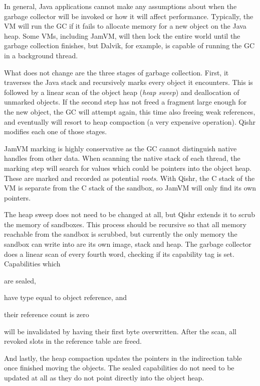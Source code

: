 \documentclass[a4paper,12pt,twoside,openright]{report}
\begin{document}
In general, Java applications cannot make any assumptions about when the garbage collector will be invoked or how it will affect performance. Typically, the VM will run the GC if it fails to allocate memory for a new object on the Java heap. Some VMs, including JamVM, will then lock the entire world until the garbage collection finishes, but Dalvik, for example, is capable of running the GC in a background thread. 

What does not change are the three stages of garbage collection. First, it traverses the Java stack and recursively marks every object it encounters. This is followed by a linear scan of the object heap (\emph{heap sweep}) and deallocation of unmarked objects. If the second step has not freed a fragment large enough for the new object, the GC will attempt again, this time also freeing weak references, and eventually will resort to heap compaction (a very expensive operation). Qishr modifies each one of those stages.

JamVM marking is highly conservative as the GC cannot distinguish native handles from other data. When scanning the native stack of each thread, the marking step will search for values which could be pointers into the object heap. These are marked and recorded as potential \emph{roots}. With Qishr, the C stack of the VM is separate from the C stack of the sandbox, so JamVM will only find its own pointers.

The heap sweep does not need to be changed at all, but Qishr extends it to scrub the memory of sandboxes. This process should be recursive so that all memory reachable from the sandbox is scrubbed, but currently the only memory the sandbox can write into are its own image, stack and heap. The garbage collector does a linear scan of every fourth word, checking if its capability tag is set. Capabilities which 
\begin{inparaenum}
\item are sealed,
\item have type equal to object reference, and
\item their reference count is zero
\end{inparaenum}
will be invalidated by having their first byte overwritten. After the scan, all revoked slots in the reference table are freed.

And lastly, the heap compaction updates the pointers in the indirection table once finished moving the objects. The sealed capabilities do not need to be updated at all as they do not point directly into the object heap.
\end{document}
